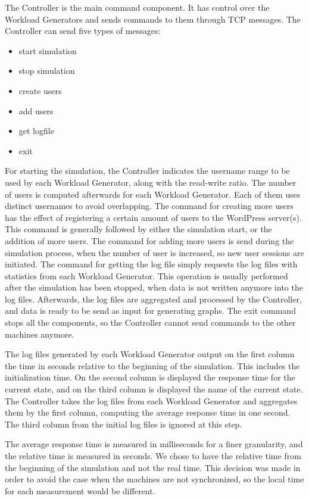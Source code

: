 The Controller is the main command component. It has control over the Workload Generators and sends commands to them through TCP messages. The Controller can send five types of messages:
\begin{itemize}
 \item start simulation
 \item stop simulation
 \item create users
 \item add users
 \item get logfile
 \item exit
\end{itemize}

For starting the simulation, the Controller indicates the username range to be used by each Workload Generator, along with the read-write ratio. The number of users is computed afterwards for each Workload Generator. Each of them uses distinct usernames to avoid overlapping. The command for creating more users has the effect of registering a certain amount of users to the WordPress server(s). This command is generally followed by either the simulation start, or the addition of more users. The command for adding more users is send during the simulation process, when the number of user is increased, so new user sessions are initiated. The command for getting the log file simply requests the log files with statistics from each Workload Generator. This operation is usually performed after the simulation has been stopped, when data is not written anymore into the log files. Afterwards, the log files are aggregated and processed by the Controller, and data is ready to be send as input for generating graphs. The exit command stops all the components, so the Controller cannot send commands to the other machines anymore.

The log files generated by each Workload Generator output on the first column the time in seconds relative to the beginning of the simulation. This includes the initialization time. On the second column is displayed the response time for the current state, and on the third column is displayed the name of the current state. The Controller takes the log files from each Workload Generator and aggregates them by the first column, computing the average response time in one second. The third column from the initial log files is ignored at this step.

The average response time is measured in milliseconds for a finer granularity, and the relative time is measured in seconds. We chose to have the relative time from the beginning of the simulation and not the real time. This decision was made in order to avoid the case when the machines are not synchronized, so the local time for each measurement would be different.

